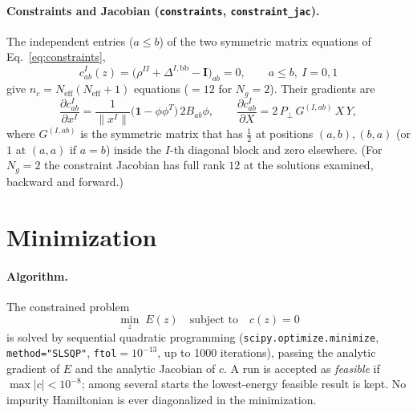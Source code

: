 \documentclass[11pt]{article}
\newcommand{\Neff}{N_{\mathrm{eff}}}
\newcommand{\Ng}{N_{g}}
\newcommand{\Ybb}{\Delta^{I,\mathrm{bb}}}
\begin{document}
\paragraph{Constraints and Jacobian (\texttt{constraints}, \texttt{constraint\_jac}).} The
independent entries ($a\le b$) of the two symmetric matrix equations of
Eq.~\eqref{eq:constraints},
\begin{equation}
  c^{I}_{ab}(z)=\bigl(\rho^{II}+\Ybb-\mathbf I\bigr)_{ab}=0,
  \qquad a\le b,\ I=0,1
\end{equation}
give $n_c=\Neff(\Neff+1)$ equations ($=12$ for $\Ng=2$). Their gradients are
\begin{equation}
  \frac{\partial c^{I}_{ab}}{\partial x^{I}}=\frac{1}{\lVert x^I\rVert}
    \bigl(\mathbf 1-\phi\phi^{T}\bigr)\,2B_{ab}\phi,\qquad
  \frac{\partial c^{I}_{ab}}{\partial X}=2\,P_\perp\,G^{(I,ab)}\,X\,Y,
\end{equation}
where $G^{(I,ab)}$ is the symmetric matrix that has $\tfrac12$ at positions $(a,b),(b,a)$
(or $1$ at $(a,a)$ if $a=b$) inside the $I$-th diagonal block and zero elsewhere.
(For $\Ng=2$ the constraint Jacobian has full rank $12$ at the solutions examined, backward and forward.)

\section{Minimization}
\label{sec:minimization}

\paragraph{Algorithm.} The constrained problem
\begin{equation}
  \min_{z}\;E(z)\quad\text{subject to}\quad c(z)=0
\end{equation}
is solved by sequential quadratic programming (\texttt{scipy.optimize.minimize},
\texttt{method="SLSQP"}, \texttt{ftol}$=10^{-13}$, up to 1000 iterations), passing the
analytic gradient of $E$ and the analytic Jacobian of $c$. A run is accepted as
\emph{feasible} if $\max|c|<10^{-8}$; among several starts the lowest-energy feasible
result is kept. No impurity Hamiltonian is ever diagonalized in the minimization.
\end{document}
